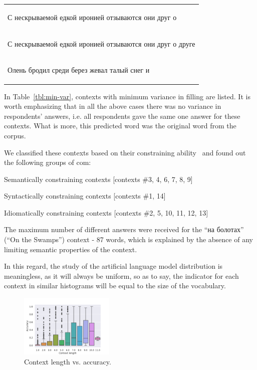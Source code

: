 \documentclass[a4paper]{article}
\begin{document}
\begin{table}
\begin{tabular}{l}
\begin{russian} С нескрываемой едкой иронией отзываются они друг о\end{russian} \\
\begin{russian} С нескрываемой едкой иронией отзываются они друг о друге\end{russian} \\
\begin{russian} Олень бродил среди берез жевал талый снег и\end{russian} \\
\end{tabular}
\end{table}

In Table~\ref{tbl:min-var}, contexts with minimum variance in filling
are listed. It is worth emphasizing that in all the above cases there
was no variance in respondents’ answers, i.e. all respondents gave the
same one answer for these contexts. What is more, this predicted word
was the original word from the corpus.

We classified these contexts based on their constraining ability
 and found out the following groups of com:

Semantically constraining contexts [contexts \#3, 4, 6, 7, 8, 9]

Syntactically constraining contexts [contexts \#1, 14]

Idiomatically constraining contexts [contexts \#2, 5, 10, 11, 12, 13]

The maximum number of different answers were received for the “на болотах” (“On the Swamps”) context - 87 words, which is explained by the absence of any limiting semantic properties of the context.

In this regard, the study of the artificial language model distribution is meaningless, as it will always be uniform, so as to say, the indicator for each context in similar histograms will be equal to the size of the vocabulary.

\begin{figure}
\caption{Context length vs. accuracy.}
\centering

\includegraphics[width=0.4\textwidth]{figures/pdf/context-accuracy.pdf}

\end{figure}
\end{document}

